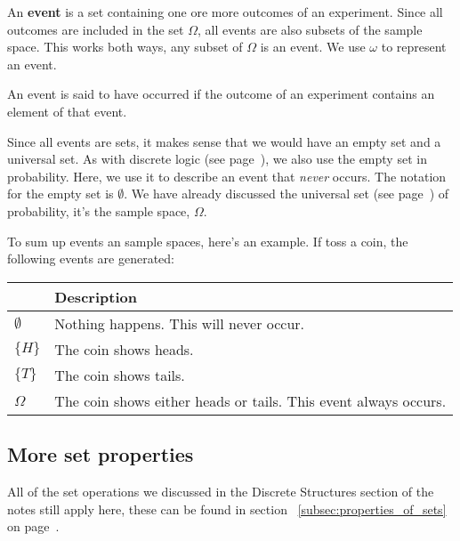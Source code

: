 \documentclass{article}
\begin{document}
An {\bf event} is a set containing one ore more outcomes of an experiment. Since
all outcomes are included in the set $\Omega$, all events are also subsets of
the sample space. This works both ways, any subset of $\Omega$ is an event. We
use $\omega$ to represent an event.

An event is said to have occurred if the outcome of an experiment contains an
element of that event.

Since all events are sets, it makes sense that we would have an empty set and a
universal set. As with discrete logic (see page~\pageref{subsubsec:empty_set}),
we also use the empty set in probability. Here, we use it to describe an event
that {\it never} occurs. The notation for the empty set is $\emptyset$. We have
already discussed the universal set (see page~\pageref{subsubsec:universal_set})
of probability, it's the sample space, $\Omega$.


To sum up events an sample spaces, here's an example. If toss a coin, the
following events are generated:

\begin{center}
	\begin{tabular}{|>{\centering\arraybackslash}m{1cm}|m{8cm}|}
		\hline
		{\bf Event} & {\bf Description}\\ \hline
		$\emptyset$ & Nothing happens. This will never occur.\\ \hline
		$\{H\}$     & The coin shows heads.\\ \hline
		$\{T\}$     & The coin shows tails.\\ \hline
		$\Omega$    & The coin shows either heads or tails. This event always occurs.\\
		\hline
	\end{tabular}
\end{center}


\subsection{More set properties}

All of the set operations we discussed in the Discrete Structures section of the
notes still apply here, these can be found in section
~\ref{subsec:properties_of_sets} on page~\pageref{subsec:properties_of_sets}.
\end{document}
